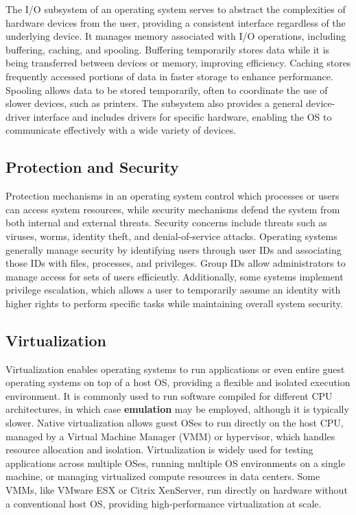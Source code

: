     The I/O subsystem of an operating system serves to abstract the complexities of hardware devices from the user, providing a consistent interface regardless of the underlying device. It manages memory associated with I/O operations, including buffering, caching, and spooling. Buffering temporarily stores data while it is being transferred between devices or memory, improving efficiency. Caching stores frequently accessed portions of data in faster storage to enhance performance. Spooling allows data to be stored temporarily, often to coordinate the use of slower devices, such as printers. The subsystem also provides a general device-driver interface and includes drivers for specific hardware, enabling the OS to communicate effectively with a wide variety of devices.


\subsection{Protection and Security}

    Protection mechanisms in an operating system control which processes or users can access system resources, while security mechanisms defend the system from both internal and external threats. Security concerns include threats such as viruses, worms, identity theft, and denial-of-service attacks. Operating systems generally manage security by identifying users through user IDs and associating those IDs with files, processes, and privileges. Group IDs allow administrators to manage access for sets of users efficiently. Additionally, some systems implement privilege escalation, which allows a user to temporarily assume an identity with higher rights to perform specific tasks while maintaining overall system security.


\subsection{Virtualization}

Virtualization enables operating systems to run applications or even entire guest operating systems on top of a host OS, providing a flexible and isolated execution environment. It is commonly used to run software compiled for different CPU architectures, in which case \textbf{emulation} may be employed, although it is typically slower. Native virtualization allows guest OSes to run directly on the host CPU, managed by a Virtual Machine Manager (VMM) or hypervisor, which handles resource allocation and isolation. Virtualization is widely used for testing applications across multiple OSes, running multiple OS environments on a single machine, or managing virtualized compute resources in data centers. Some VMMs, like VMware ESX or Citrix XenServer, run directly on hardware without a conventional host OS, providing high-performance virtualization at scale.



